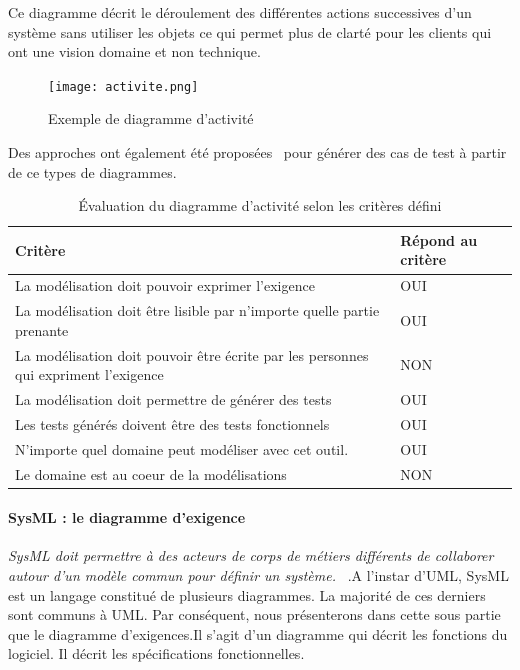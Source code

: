         Ce diagramme décrit le déroulement des différentes actions successives d'un système sans utiliser les objets ce qui permet plus de clarté pour les clients qui ont une vision domaine et non technique.
             \begin{figure}[H]
                \centering
                \texttt{[image: activite.png]}
                \caption{Exemple de diagramme d'activité}
            \end{figure}
        Des approches ont également été proposées~\cite{article10} pour générer des cas de test à partir de ce types de diagrammes.
        \begin{table}[H]
        \centering
         \begin{tabular}{|p{25em}|p{5em}|} 
         \hline
        Critère & Répond au critère \\ [0.5ex] 
         \hline
         La modélisation doit pouvoir exprimer l’exigence & \cellcolor[HTML]{699A73}OUI\\
         \hline
        La modélisation doit être lisible par n’importe quelle partie prenante & \cellcolor[HTML]{699A73}OUI\\
         \hline
        La modélisation doit pouvoir être écrite par les personnes qui expriment l’exigence &\cellcolor[HTML]{D03737} NON \\
         \hline
        La modélisation doit permettre de générer des tests & \cellcolor[HTML]{699A73}OUI \\
         \hline
        Les tests générés doivent être des tests fonctionnels &\cellcolor[HTML]{699A73} OUI\\ 
         \hline
        N’importe quel domaine peut modéliser avec cet outil.&\cellcolor[HTML]{699A73} OUI\\ 
         \hline
        Le domaine est au coeur de la modélisations &\cellcolor[HTML]{D03737} NON\\ 
        \hline 
        \end{tabular}
        \caption{Évaluation du diagramme d'activité selon les critères défini}
        \end{table}
    
        \paragraph{SysML : le diagramme d'exigence}

        \textit{SysML doit permettre à des acteurs de corps de métiers différents de collaborer autour d'un modèle commun pour définir un système. }~\cite{sysml}.A l'instar d'UML, SysML est un langage constitué de plusieurs diagrammes. La majorité de ces derniers sont communs à UML. Par conséquent, nous présenterons dans cette sous partie que le diagramme d'exigences.Il s'agit d'un diagramme qui décrit les fonctions du logiciel. Il décrit les spécifications fonctionnelles.
    
